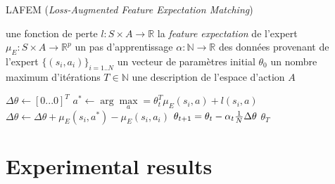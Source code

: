 \documentclass[publibook-draft]{CAp2012}
\begin{document}
\begin{algorithm}
\caption{LAFEM ({\it Loss-Augmented Feature Expectation Matching})}
\label{LAFEM.alg}
\begin{algorithmic}
  \REQUIRE une fonction de perte $l : S\times A \rightarrow \mathbb R$
  \REQUIRE la \emph{feature expectation} de l'expert $\mu_E : S\times A \rightarrow \mathbb R ^p$
  \REQUIRE un pas d'apprentissage $\alpha : \mathbb N \rightarrow \mathbb R$
  \REQUIRE des données provenant de l'expert $\{(s_i,a_i)\}_{i=1..N}$
  \REQUIRE un vecteur de paramètres initial $\theta_0$
  \REQUIRE un nombre maximum d'itérations $T\in \mathbb N$
  \REQUIRE une description de l'espace d'action $A$

     
  \STATE $\Delta\theta \leftarrow [0...0]^T$
    \STATE $a^* \leftarrow \arg\max\limits_{a} = \theta_t ^T \mu_E(s_i,a) + l(s_i,a)$
    \STATE $\Delta\theta \leftarrow \Delta\theta + \mu_E(s_i,a^*) - \mu_E(s_i,a_i)$
    \ENDFOR
    \STATE $\theta_{t+1} = \theta_t -\alpha_t{1\over N}\Delta\theta$
    \ENDFOR
    \RETURN $\theta_T$
\end{algorithmic}
\end{algorithm}
\section{Experimental results}
\end{document}
